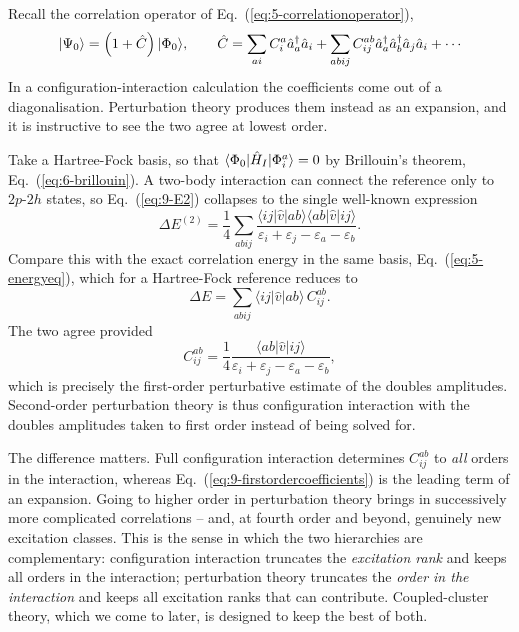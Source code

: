 Recall the correlation operator of Eq.~(\ref{eq:5-correlationoperator}),
\begin{equation}
  \bket{\Psi_0} = \left(1+\hat{C}\right)\bket{\Phi_0},
  \qquad
  \hat{C} = \sum_{ai}C_i^a\hat{a}^{\dagger}_a\hat{a}_i
    + \sum_{abij}C_{ij}^{ab}
      \hat{a}^{\dagger}_a\hat{a}^{\dagger}_b\hat{a}_j\hat{a}_i
    + \cdots
  \label{eq:9-correlationoperator}
\end{equation}
In a configuration-interaction calculation the coefficients come out of a
diagonalisation.  Perturbation theory produces them instead as an expansion,
and it is instructive to see the two agree at lowest order.

Take a Hartree-Fock basis, so that $\langle \Phi_0 | \hat{H}_I | \Phi_i^a \rangle=0$
by Brillouin's theorem, Eq.~(\ref{eq:6-brillouin}).  A two-body interaction
can connect the reference only to $2p$-$2h$ states, so
Eq.~(\ref{eq:9-E2}) collapses to the single well-known expression
\begin{equation}
  \Delta E^{(2)} = \frac{1}{4}\sum_{abij}
    \frac{\langle ij\vert\hat{v}\vert ab\rangle
          \langle ab\vert\hat{v}\vert ij\rangle}
         {\varepsilon_i+\varepsilon_j-\varepsilon_a-\varepsilon_b}.
  \label{eq:9-mp2}
\end{equation}
Compare this with the exact correlation energy in the same basis,
Eq.~(\ref{eq:5-energyeq}), which for a Hartree-Fock reference reduces to
\begin{equation}
  \Delta E = \sum_{abij}
    \langle ij\vert\hat{v}\vert ab\rangle\,C_{ij}^{ab}.
  \label{eq:9-fciDE}
\end{equation}
The two agree provided
\begin{equation}
  C_{ij}^{ab} = \frac{1}{4}
    \frac{\langle ab\vert\hat{v}\vert ij\rangle}
         {\varepsilon_i+\varepsilon_j-\varepsilon_a-\varepsilon_b},
  \label{eq:9-firstordercoefficients}
\end{equation}
which is precisely the first-order perturbative estimate of the doubles
amplitudes.  Second-order perturbation theory is thus configuration
interaction with the doubles amplitudes taken to first order instead of being
solved for.

The difference matters.  Full configuration interaction determines
$C_{ij}^{ab}$ to \emph{all} orders in the interaction, whereas
Eq.~(\ref{eq:9-firstordercoefficients}) is the leading term of an expansion.
Going to higher order in perturbation theory brings in successively more
complicated correlations -- and, at fourth order and beyond, genuinely new
excitation classes.  This is the sense in which the two hierarchies are
complementary: configuration interaction truncates the \emph{excitation
rank} and keeps all orders in the interaction; perturbation theory truncates
the \emph{order in the interaction} and keeps all excitation ranks that can
contribute.  Coupled-cluster theory, which we come to later, is designed to
keep the best of both.

